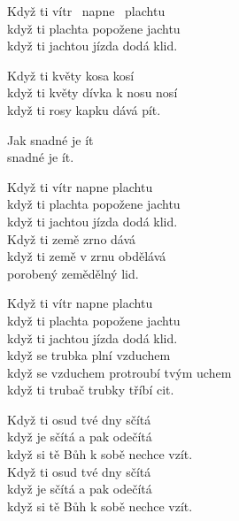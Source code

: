 
\ve{}
Když ti vítr \quad \ napne \ plachtu\\
když ti plachta popožene jachtu\\
když ti jachtou jízda dodá klid. \quad {}

\re{}
Když ti květy kosa kosí\\
když ti květy dívka k nosu nosí\\
když ti rosy kapku dává pít.

\cho
{}Jak snadné je ít \qquad {}\\
snadné je ít. \qquad {}

\ve{}
Když ti vítr napne plachtu\\
když ti plachta popožene jachtu\\
když ti jachtou jízda dodá klid.\\
Když ti země zrno dává\\
když ti země v zrnu obdělává\\
porobený zemědělný lid.

\cho{}

\ve{}
Když ti vítr napne plachtu\\
když ti plachta popožene jachtu\\
když ti jachtou jízda dodá klid.\\
když se trubka plní vzduchem\\
když se vzduchem protroubí tvým uchem\\
když ti trubač trubky tříbí cit.

\cho{}

\ve{}
Když ti osud tvé dny sčítá\\
když je sčítá a pak odečítá\\
když si tě Bůh k sobě nechce vzít.\\
Když ti osud tvé dny sčítá\\
když je sčítá a pak odečítá\\
když si tě Bůh k sobě nechce vzít.

\cho{} 

\esong